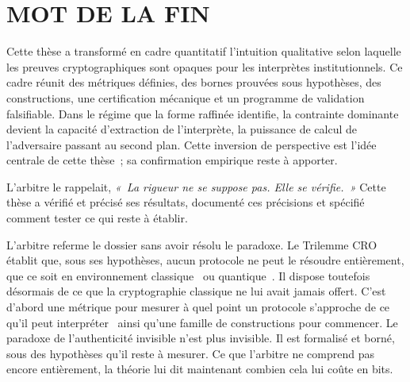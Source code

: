 \section*{MOT DE LA FIN}
\label{sec:cg_mot_fin}
\begin{sloppypar}

Cette th\`ese a transform\'e en cadre quantitatif l'intuition qualitative
selon laquelle les preuves cryptographiques sont opaques pour les interpr\`etes
institutionnels. Ce cadre r\'eunit des m\'etriques d\'efinies, des bornes
prouv\'ees sous hypoth\`eses, des constructions, une certification m\'ecanique
et un programme de validation falsifiable. Dans le r\'egime que la forme
raffin\'ee identifie, la contrainte dominante devient la capacit\'e d'extraction de l'interpr\`ete, la
puissance de calcul de l'adversaire passant au second plan.
Cette inversion de perspective est l'id\'ee centrale de cette th\`ese~; sa
confirmation empirique reste \`a apporter.

L'arbitre le rappelait, \emph{«~La rigueur ne se suppose pas. Elle se
v\'erifie.~»} Cette th\`ese a v\'erifi\'e et pr\'ecis\'e ses r\'esultats, document\'e
ces pr\'ecisions et sp\'ecifi\'e comment tester ce qui reste \`a
\'etablir. 

\end{sloppypar}

\begin{boiteArbitre}
L'arbitre referme le dossier sans avoir r\'esolu le paradoxe. Le Trilemme
CRO \'etablit que, sous ses hypoth\`eses, aucun protocole ne peut le r\'esoudre enti\`erement, que
ce soit en environnement classique~\cite{MINKA2026CRO} ou
quantique~\cite{MINKA2026PQCRO}. Il dispose toutefois d\'esormais de ce
que la cryptographie classique ne lui avait jamais offert. C'est d'abord une
m\'etrique pour mesurer \`a quel point un protocole s'approche de ce qu'il
peut interpr\'eter~\cite{MINKA2026CLO} ainsi qu'une famille de constructions pour
commencer. Le paradoxe de l'authenticit\'e invisible n'est plus invisible.
Il est formalis\'e et born\'e, sous des hypoth\`eses qu'il reste \`a mesurer. Ce que l'arbitre ne comprend pas
encore enti\`erement, la th\'eorie lui dit maintenant combien cela lui
co\^ute en bits.
\end{boiteArbitre}